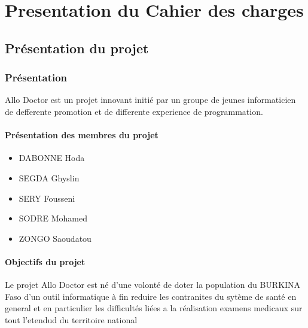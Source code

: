 \documentclass{report}
\begin{document}
   
\part{Presentation du Cahier des charges}
\chapter{Présentation du projet}
\section{Présentation}
Allo Doctor est un projet innovant initié par un groupe de jeunes informaticien de defferente promotion et de differente experience de programmation. 
\subsection{Présentation des membres du projet}
\begin{itemize}
\item DABONNE Hoda
\item SEGDA Ghyslin
\item SERY Fousseni
\item SODRE Mohamed
\item ZONGO Saoudatou
\end{itemize}
\subsection{Objectifs du projet}
Le projet Allo Doctor est né d'une volonté de doter la population du BURKINA Faso d'un outil informatique à fin reduire les contranites 
du sytème de santé en general et en particulier les difficultés liées a la réalisation examens medicaux sur tout l'etendud du territoire national
\end{document}
